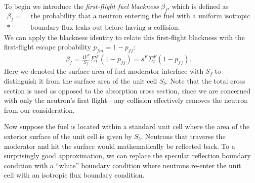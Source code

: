 To begin we introduce the \emph{first-flight fuel blackness} $\beta_f$, which is defined as
\begin{align}
  \beta_f = &\text{ the probability that a neutron entering the fuel with a uniform isotropic} \nonumber \\*
  &\text{ boundary flux leaks out before having a collision.} \nonumber
\end{align}
We can apply the blackness identity to relate this first-flight blackness with the first-flight escape probability $p_{fm} = 1 - p_{ff}$:
\begin{align}
  \beta_f = \frac{4V^F}{S_f} \Sigma_t^F ( 1 - p_{ff} ) = \overline{s}^F \Sigma_t^F ( 1 - p_{ff} ). \label{Eqn:LatticePhysics_FirstFlightBlacknessIdentity}
\end{align}
Here we denoted the surface area of fuel-moderator interface with $S_f$ to distinguish it from the surface area of the unit cell $S_b$. Note that the total cross section is used as opposed to the absorption cross section, since we are concerned with only the neutron's first flight---any collision effectively removes the neutron from our consideration.

Now suppose the fuel is located within a standard unit cell where the area of the exterior surface of the unit cell is given by $S_b$. Neutrons that traverse the moderator and hit the surface would mathematically be reflected back. To a surprisingly good approximation, we can replace the specular reflection boundary condition with a ``white'' boundary condition where neutrons re-enter the unit cell with an isotropic flux boundary condition. 

